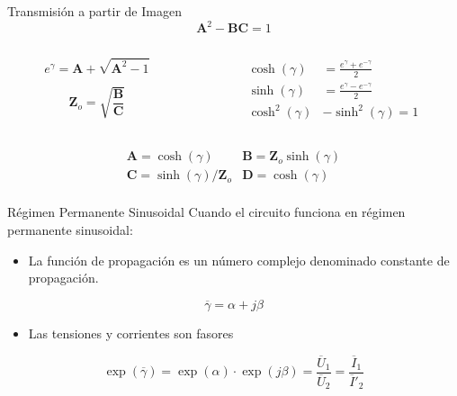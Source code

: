 \documentclass[xcolor={usenames,svgnames,dvipsnames}]{beamer}
\begin{document}
\begin{frame}[label={sec:org961e306}]{Transmisión a partir de Imagen}
\[
\mathbf{A}^2 - \mathbf{B}\mathbf{C} = 1
\]

\begin{columns}
\begin{column}{0.33\columnwidth}
\[
  e^\gamma = \mathbf{A} + \sqrt{\mathbf{A}^2 - 1}
\]

\[
  \mathbf{Z}_o = \sqrt{\frac{\mathbf{B}}{\mathbf{C}}}
\]
\end{column}

\begin{column}{0.33\columnwidth}
\begin{align*}
  \cosh(\gamma) &= \frac{e^\gamma + e^{-\gamma}}{2}\\
  \sinh(\gamma) &= \frac{e^\gamma - e^{-\gamma}}{2}\\
  \cosh^2(\gamma) &- \sinh^2(\gamma) = 1
\end{align*}
\end{column}
\end{columns}

\vspace{1cm}
\[
\boxed{
  \begin{array}{ll}
    \mathbf{A} = \cosh(\gamma) &
    \mathbf{B} = \mathbf{Z}_o \sinh(\gamma)\\
    \mathbf{C} = \sinh(\gamma)/\mathbf{Z}_o &
    \mathbf{D} = \cosh(\gamma)\\
  \end{array}
}
\]
\end{frame}

\begin{frame}[label={sec:org43b8179}]{Régimen Permanente Sinusoidal}
Cuando el circuito funciona en régimen permanente sinusoidal:

\begin{itemize}
\item La función de propagación es un número complejo denominado constante de propagación.
\end{itemize}
\[
  \overline{\gamma} = \alpha + j\beta
\]
\begin{itemize}
\item Las tensiones y corrientes son fasores
\end{itemize}
\[
  \exp(\overline{\gamma}) = \exp(\alpha) \cdot \exp(j\beta) = \frac{\overline{U}_1}{\overline{U}_2} = \frac{\overline{I}_1}{\overline{I}'_2}
\]
\end{frame}
\end{document}
